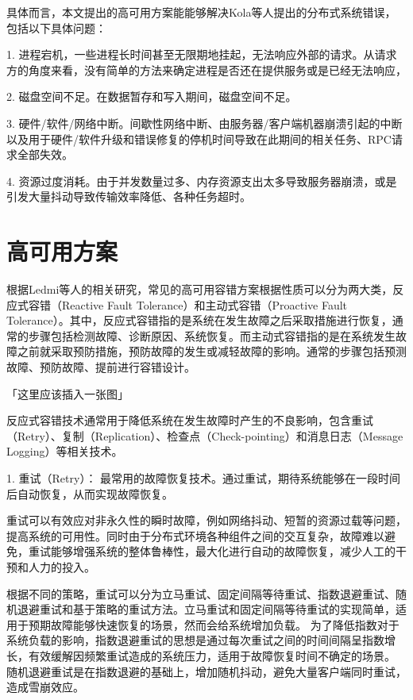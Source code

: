 具体而言，本文提出的高可用方案能能够解决Kola\cite{kola2005faults}等人提出的分布式系统错误，包括以下具体问题：

1. 进程宕机，一些进程长时间甚至无限期地挂起，无法响应外部的请求。从请求方的角度来看，没有简单的方法来确定进程是否还在提供服务或是已经无法响应，

2. 磁盘空间不足。在数据暂存和写入期间，磁盘空间不足。

3. 硬件/软件/网络中断。间歇性网络中断、由服务器/客户端机器崩溃引起的中断以及用于硬件/软件升级和错误修复的停机时间导致在此期间的相关任务、RPC请求全部失效。

4. 资源过度消耗。由于并发数量过多、内存资源支出太多导致服务器崩溃，或是引发大量抖动导致传输效率降低、各种任务超时。


\section{高可用方案}

根据Ledmi\cite{ledmi2018fault}等人的相关研究，常见的高可用容错方案根据性质可以分为两大类，反应式容错（Reactive Fault Tolerance）和主动式容错（Proactive Fault Tolerance）。其中，反应式容错指的是系统在发生故障之后采取措施进行恢复，通常的步骤包括检测故障、诊断原因、系统恢复。而主动式容错指的是在系统发生故障之前就采取预防措施，预防故障的发生或减轻故障的影响。通常的步骤包括预测故障、预防故障、提前进行容错设计。

「这里应该插入一张图」

反应式容错技术通常用于降低系统在发生故障时产生的不良影响，包含重试（Retry）、复制（Replication）、检查点（Check-pointing）和消息日志（Message Logging）等相关技术。

1. 重试（Retry）： 最常用的故障恢复技术。通过重试，期待系统能够在一段时间后自动恢复，从而实现故障恢复。

重试可以有效应对非永久性的瞬时故障，例如网络抖动、短暂的资源过载等问题，提高系统的可用性。同时由于分布式环境各种组件之间的交互复杂，故障难以避免，重试能够增强系统的整体鲁棒性，最大化进行自动的故障恢复，减少人工的干预和人力的投入。

根据不同的策略，重试可以分为立马重试、固定间隔等待重试、指数退避重试、随机退避重试和基于策略的重试方法。立马重试和固定间隔等待重试的实现简单，适用于预期故障能够快速恢复的场景，然而会给系统增加负载。
为了降低指数对于系统负载的影响，指数退避重试的思想是通过每次重试之间的时间间隔呈指数增长，有效缓解因频繁重试造成的系统压力，适用于故障恢复时间不确定的场景。
随机退避重试是在指数退避的基础上，增加随机抖动，避免大量客户端同时重试，造成雪崩效应。

